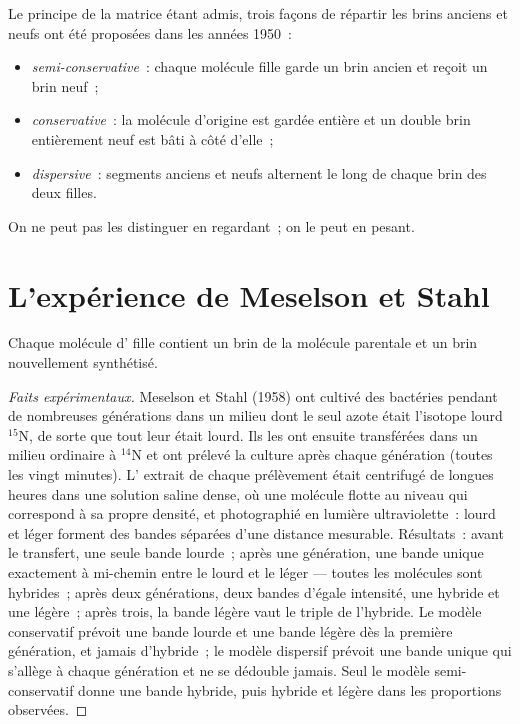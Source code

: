 \begin{example}\label{ex:g11:dna-replication:models}
Le principe de la matrice étant admis, trois façons de répartir les
brins anciens et neufs ont été proposées dans les années 1950~:
\begin{itemize}
  \item \emph{semi-conservative}~: chaque molécule fille garde un brin
        ancien et reçoit un brin neuf~;
  \item \emph{conservative}~: la molécule d'origine est gardée entière
        et un double brin entièrement neuf est bâti à côté d'elle~;
  \item \emph{dispersive}~: segments anciens et neufs alternent le long
        de chaque brin des deux filles.
\end{itemize}
On ne peut pas les distinguer en regardant~; on le peut en pesant.
\end{example}

\section{L'expérience de Meselson et Stahl}

\begin{proposition}\label{prop:g11:dna-replication:semiconservative}
Chaque molécule d' fille contient un brin de la molécule parentale
et un brin nouvellement synthétisé.
\end{proposition}
\begin{proof}[Faits expérimentaux]
Meselson et Stahl (1958) ont cultivé des bactéries pendant de
nombreuses générations dans un milieu dont le seul azote était
l'isotope lourd $^{15}$N, de sorte que tout leur  était lourd. Ils
les ont ensuite transférées dans un milieu ordinaire à $^{14}$N et ont
prélevé la culture après chaque génération (toutes les vingt minutes).
L' extrait de chaque prélèvement était centrifugé de longues heures
dans une solution saline dense, où une molécule flotte au niveau qui
correspond à sa propre densité, et photographié en lumière
ultraviolette~:  lourd et  léger forment des bandes séparées
d'une distance mesurable. Résultats~: avant le transfert, une seule
bande lourde~; après une génération, une bande unique exactement à
mi-chemin entre le lourd et le léger --- toutes les molécules sont
hybrides~; après deux générations, deux bandes d'égale intensité, une
hybride et une légère~; après trois, la bande légère vaut le triple de
l'hybride. Le modèle conservatif prévoit une bande lourde et une bande
légère dès la première génération, et jamais d'hybride~; le modèle
dispersif prévoit une bande unique qui s'allège à chaque génération et
ne se dédouble jamais. Seul le modèle semi-conservatif donne une bande
hybride, puis hybride et légère dans les proportions observées.
\end{proof}

